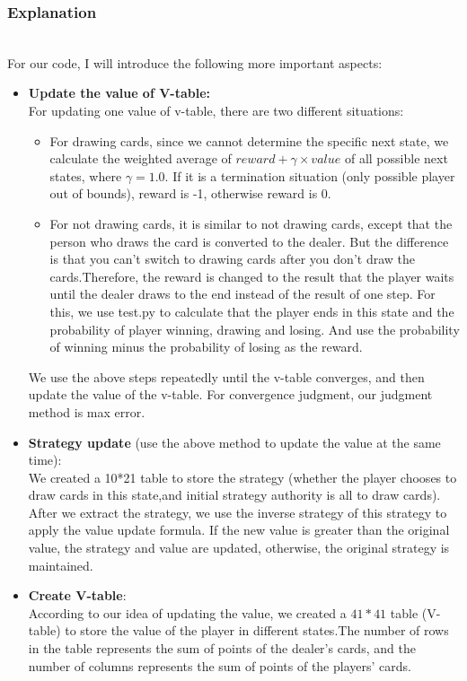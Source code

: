 \documentclass[12pt]{article}
\begin{document}
\subsubsection{Explanation}

~\\\indent For our code, I will introduce the following more important aspects:

\begin{itemize}
  \item \textbf{Update the value of V-table:}
  ~\\For updating one value of v-table, there are two different situations:
  \begin{itemize}
    \item For drawing cards, since we cannot determine the specific next state, we calculate the weighted average of $reward+\gamma \times value$ of all possible next states, where $\gamma=1.0$. If it is a termination situation (only possible player out of bounds), reward is -1, otherwise reward is 0.
    \item For not drawing cards, it is similar to not drawing cards, except that the person who draws the card is converted to the dealer. But the difference is that you can't switch to drawing cards after you don't draw the cards.Therefore, the reward is changed to the result that the player waits until the dealer draws to the end instead of the result of one step. For this, we use test.py to calculate that the player ends in this state and the probability of player winning, drawing and losing. And use the probability of winning minus the probability of losing as the reward.
  \end{itemize}
  We use the above steps repeatedly until the v-table converges, and then update the value of the v-table. For convergence judgment, our judgment method is max error.
  
  \item \textbf{Strategy update} (use the above method to update the value at the same time):
    ~\\We created a 10*21 table to store the strategy (whether the player chooses to draw cards in this state,and initial strategy authority is all to draw cards). After we extract the strategy, we use the inverse strategy of this strategy to apply the value update formula. If the new value is greater than the original value, the strategy and value are updated, otherwise, the original strategy is maintained.
  
  \item \textbf{Create V-table}:
    ~\\According to our idea of updating the value, we created a $41*41$ table (V-table) to store the value of the player in different states.The number of rows in the table represents the sum of points of the dealer's cards, and the number of columns represents the sum of points of the players' cards.
  

\end{itemize}
\end{document}
